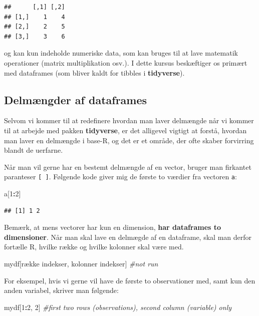 \documentclass[
]{book}
\newenvironment{Shaded}{\begin{snugshade}}{\end{snugshade}}
\newcommand{\CommentTok}[1]{\textcolor[rgb]{0.56,0.35,0.01}{\textit{#1}}}
\newcommand{\DecValTok}[1]{\textcolor[rgb]{0.00,0.00,0.81}{#1}}
\newcommand{\NormalTok}[1]{#1}
\newcommand{\SpecialCharTok}[1]{\textcolor[rgb]{0.81,0.36,0.00}{\textbf{#1}}}
\begin{document}
\begin{verbatim}
##      [,1] [,2]
## [1,]    1    4
## [2,]    2    5
## [3,]    3    6
\end{verbatim}

og kan kun indeholde numeriske data, som kan bruges til at lave matematik operationer (matrix multiplikation osv.). I dette kursus beskæftiger os primært med dataframes (som bliver kaldt for tibbles i \textbf{tidyverse}).

\subsection{Delmængder af dataframes}\label{delmuxe6ngder-af-dataframes}

Selvom vi kommer til at redefinere hvordan man laver delmængde når vi kommer til at arbejde med pakken \textbf{tidyverse}, er det alligevel vigtigt at forstå, hvordan man laver en delmængde i base-R, og det er et område, der ofte skaber forvirring blandt de uerfarne.

Når man vil gerne har en bestemt delmængde af en vector, bruger man firkantet paranteser \texttt{{[}\ {]}}. Følgende kode giver mig de første to værdier fra vectoren \texttt{a}:

\begin{Shaded}
\begin{Highlighting}[]
\NormalTok{a[}\DecValTok{1}\SpecialCharTok{:}\DecValTok{2}\NormalTok{]}
\end{Highlighting}
\end{Shaded}

\begin{verbatim}
## [1] 1 2
\end{verbatim}

Bemærk, at mens vectorer har kun en dimension, \textbf{har dataframes to dimensioner}. Når man skal lave en delmægde af en dataframe, skal man derfor fortælle R, hvilke række og hvilke kolonner skal være med.

\begin{Shaded}
\begin{Highlighting}[]
\NormalTok{mydf[række indekser, kolonner indekser]  }\CommentTok{\#not run}
\end{Highlighting}
\end{Shaded}

For eksempel, hvis vi gerne vil have de første to observationer med, samt kun den anden variabel, skriver man følgende:

\begin{Shaded}
\begin{Highlighting}[]
\NormalTok{mydf[}\DecValTok{1}\SpecialCharTok{:}\DecValTok{2}\NormalTok{, }\DecValTok{2}\NormalTok{]  }\CommentTok{\#first two rows (observations), second column (variable) only}
\end{Highlighting}
\end{Shaded}
\end{document}
